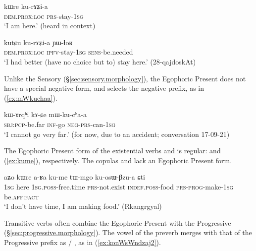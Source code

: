 \begin{exe}
\ex \label{ex:kurAZia.egoph}
\gll kɯre ku-rɤʑi-a \\
\textsc{dem}.\textsc{prox}:\textsc{loc} \textsc{prs}-stay-\textsc{1sg} \\
\glt `I am here.' (heard in context)
\end{exe}

\begin{exe}
\ex \label{ex:kurAZia.ipfv}
\gll kutɕu ku-rɤʑi-a ɲɯ-ɬoʁ \\
\textsc{dem}.\textsc{prox}:\textsc{loc} \textsc{ipfv}-stay-\textsc{1sg} \textsc{sens}-be.needed \\
\glt `I had better (have no choice but to) stay here.' (28-qajdoskAt) 
\end{exe}
 
Unlike the Sensory (§\ref{sec:sensory.morphology}), the Egophoric Present does not have a special negative form, and selects the  negative prefix, as in (\ref{ex:mWkuchaa}).

\begin{exe}
\ex \label{ex:mWkuchaa}
\gll kɯ-ɤrqʰi kɤ-ɕe mɯ-ku-cʰa-a \\
\textsc{sbj}:\textsc{pcp}-be.far \textsc{inf}-go \textsc{neg}-\textsc{prs}-can-\textsc{1sg} \\
\glt `I cannot go very far.' (for now, due to an accident; conversation 17-09-21)
\end{exe}

The Egophoric Present form of the existential verbs  and  is regular:  and  (\ref{ex:kume}), respectively. The copulas  and  lack an Egophoric Present form.

\begin{exe}
	\ex \label{ex:kume}
	\gll aʑo kɯre a-ʁa ku-me tɯ-mgo ku-osɯ-βzu-a ɕti \\
	\textsc{1sg} here \textsc{1sg}.\textsc{poss}-free.time \textsc{prs}-not.exist \textsc{indef}.\textsc{poss}-food \textsc{prs}-\textsc{prog}-make-\textsc{1sg} be.\textsc{aff}:\textsc{fact}\\
	\glt `I don't have time, I am making food.'  (Rkangrgyal) 
\end{exe}

Transitive verbs often combine the Egophoric Present with the Progressive  (§\ref{sec:progressive.morphology}). The vowel of the preverb merges with that of the Progressive prefix as  / , as in (\ref{ex:konWsWndzaj2}).

